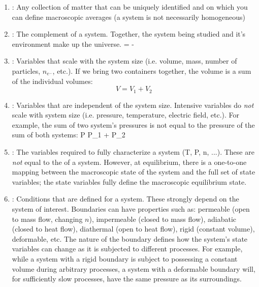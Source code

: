 \documentclass[12pt]{article}
\begin{document}
\begin{enumerate}
\item {}: Any collection of matter that can be uniquely identified and on which you can define macroscopic averages (a system is not necessarily homogeneous)
\item {}: The complement of a system. Together, the system being studied and it's environment make up the universe. 
\eqs
\text{[environment]} = \text{[universe]} - \text{[system]}
\eqe
\item {}: Variables that scale with the system size (i.e. volume, mass, number of particles, $n_{e^-}$, etc.).  If we bring two containers together, the volume is a sum of the individual volumes:
\begin{equation}
V = V_1 + V_2
\end{equation}
\item {}: Variables that are independent of the system size. Intensive variables do \emph{not} scale with system size (i.e. pressure, temperature, electric field, etc.).  For example, the sum of two system's pressures is not equal to the pressure of the sum of both systems:
\eqs
P \neq P_1 + P_2
\eqe
\item {}: The variables required to fully characterize a system (T, P, n, ...).  These are \emph{not} equal to the  of a system. However, at equilibrium, there is a one-to-one mapping between the macroscopic state of the system and the full set of state variables; the state variables fully define the macroscopic equilibrium state. %
\item {}: Conditions that are defined for a system.  These strongly depend on the system of interest. Boundaries can have properties such as: permeable (open to mass flow, changing $n$), impermeable (closed to mass flow), adiabatic (closed to heat flow), diathermal (open to heat flow), rigid (constant volume), deformable, etc. The nature of the boundary defines how the system's state variables can change as it is subjected to different processes. For example, while a system with a rigid boundary is subject to possessing a constant volume during arbitrary processes, a system with a deformable boundary will, for sufficiently slow processes, have the same pressure as its surroundings.
\end{enumerate}
\end{document}
